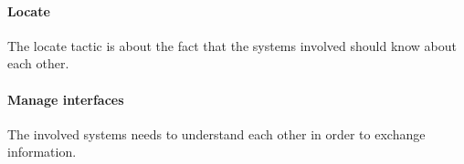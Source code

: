 \paragraph*{Locate}
The locate tactic is about the fact that the systems involved should know about each other. 

\paragraph*{Manage interfaces}
The involved systems needs to understand each other in order to exchange information.








